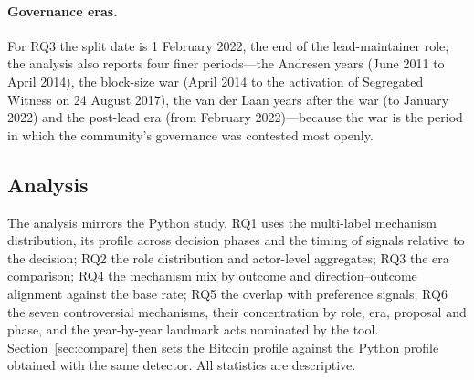 \paragraph{Governance eras.} For RQ3 the split date is 1 February 2022, the end of the lead-maintainer role; the analysis also reports four finer periods---the Andresen years (June 2011 to April 2014), the block-size war (April 2014 to the activation of Segregated Witness on 24 August 2017), the van der Laan years after the war (to January 2022) and the post-lead era (from February 2022)---because the war is the period in which the community's governance was contested most openly.

\subsection{Analysis}

The analysis mirrors the Python study. RQ1 uses the multi-label mechanism distribution, its profile across decision phases and the timing of signals relative to the decision; RQ2 the role distribution and actor-level aggregates; RQ3 the era comparison; RQ4 the mechanism mix by outcome and direction--outcome alignment against the base rate; RQ5 the overlap with preference signals; RQ6 the seven controversial mechanisms, their concentration by role, era, proposal and phase, and the year-by-year landmark acts nominated by the tool. Section~\ref{sec:compare} then sets the Bitcoin profile against the Python profile obtained with the same detector. All statistics are descriptive.

